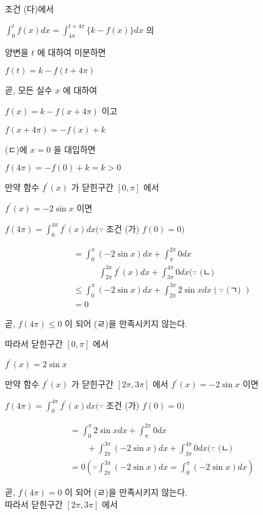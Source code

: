 \documentclass[10pt]{article}
\begin{document}
조건 (다)에서

$\int_{0}^{t} f(x) d x=\int_{4 \pi}^{t+4 \pi}\{k-f(x)\} d x$ 의

양변을 $t$ 에 대하여 미분하면

$f(t)=k-f(t+4 \pi)$

곧, 모든 실수 $x$ 에 대하여

$f(x)=k-f(x+4 \pi)$ 이고

$f(x+4 \pi)=-f(x)+k$

(ㄷ)에 $x=0$ 을 대입하면

$f(4 \pi)=-f(0)+k=k>0$

만약 함수 $f^{\prime}(x)$ 가 닫힌구간 $[0, \pi]$ 에서

$f^{\prime}(x)=-2 \sin x$ 이면

$f(4 \pi)=\int_{0}^{4 \pi} f^{\prime}(x) d x(\because$ 조건 (가) $f(0)=0)$

\[
\begin{aligned}
& =\int_{0}^{\pi}(-2 \sin x) d x+\int_{\pi}^{2 \pi} 0 d x \\
& \quad \quad \quad \int_{2 \pi}^{3 \pi} f^{\prime}(x) d x+\int_{3 \pi}^{4 \pi} 0 d x(\because \text { (ㄴ) } \\
& \leq \int_{0}^{\pi}(-2 \sin x) d x+\int_{2 \pi}^{3 \pi} 2 \sin x d x(\because \text { (ㄱ) }) \\
& =0
\end{aligned}
\]

곧, $f(4 \pi) \leq 0$ 이 되어 (ㄹ)을 만족시키지 않는다.

따라서 닫힌구간 $[0, \pi]$ 에서

$f^{\prime}(x)=2 \sin x$

만약 함수 $f^{\prime}(x)$ 가 닫힌구간 $[2 \pi, 3 \pi]$ 에서 $f^{\prime}(x)=-2 \sin x$ 이면

$f(4 \pi)=\int_{0}^{4 \pi} f^{\prime}(x) d x(\because$ 조건 (가) $f(0)=0)$

\[
\begin{aligned}
& =\int_{0}^{\pi} 2 \sin x d x+\int_{\pi}^{2 \pi} 0 d x \\
& \quad \quad+\int_{2 \pi}^{3 \pi}(-2 \sin x) d x+\int_{3 \pi}^{4 \pi} 0 d x(\because \text { (ㄴ) } \\
& =0\left(\because \int_{2 \pi}^{3 \pi}(-2 \sin x) d x=\int_{0}^{\pi}(-2 \sin x) d x\right)
\end{aligned}
\]

곧, $f(4 \pi)=0$ 이 되어 (ㄹ)을 만족시키지 않는다.\\
따라서 닫힌구간 $[2 \pi, 3 \pi]$ 에서
\end{document}
